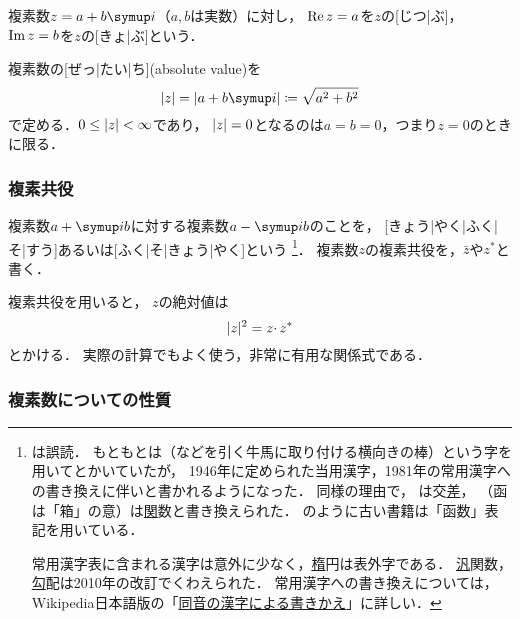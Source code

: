 \documentclass[../sotsu.tex]{subfiles}
\begin{document}
複素数$z = a + b\iu$（$a, b$は実数）に対し，
$\operatorname{Re} z = a$を$z$の[じつ|ぶ]，
$\operatorname{Im} z = b$を$z$の[きょ|ぶ]という．

複素数の[ぜっ|たい|ち](absolute value)を
\begin{equation}
    \label{eq:complex-number-abs}
    \abs{z} 
        = \abs{a + b\iu}
        \coloneq \sqrt{a^2 + b^2}
\end{equation}
で定める．$0 \leq \lvert z\rvert < \infty$であり，
$\lvert z\rvert = 0$となるのは$a = b = 0$，つまり$z = 0$のときに限る．



\subsubsection*{複素共役}

複素数$a + \iu b$に対する複素数$a - \iu b$のことを，
[きょう|やく|ふく|そ|すう]あるいは[ふく|そ|きょう|やく]という%
\footnote{
    は誤読．
    もともとは（などを引く牛馬に取り付ける横向きの棒）という字を用いてとかいていたが，
    1946年に定められた当用漢字，1981年の常用漢字への書き換えに伴いと書かれるようになった．
    同様の理由で，
    は交\underline{差}，
    （函は「箱」の意）は\underline{関}数と書き換えられた．
    \cite{ito-lebesgue-1963}のように古い書籍は「函数」表記を用いている．
    
    常用漢字表に含まれる漢字は意外に少なく，\underline{楕}円は表外字である．
    \underline{汎}関数，\underline{勾}配は2010年の改訂でくわえられた．
    常用漢字への書き換えについては，
    Wikipedia日本語版の「\href{https://ja.wikipedia.org/wiki/同音の漢字による書きかえ}{同音の漢字による書きかえ}」に詳しい．
}．
複素数$z$の複素共役を，$\bar{z}$や$z^*$と書く．

複素共役を用いると，
$z$の絶対値は
\begin{equation}
    \abs{z}^2 = z \cdotp \conj{z}
\end{equation}
とかける．
実際の計算でもよく使う，非常に有用な関係式である．



\subsubsection*{複素数についての性質}
\end{document}
